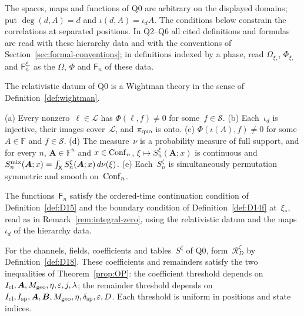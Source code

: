 The spaces, maps and functions of Q0 are arbitrary on the displayed domains; put $\deg(d,A)=d$ and $\iota(d,A)=\iota_dA$. The conditions below constrain the correlations at separated positions. In Q2--Q6 all cited definitions and formulas are read with these hierarchy data and with the conventions of Section~\ref{sec:formal-conventions}; in definitions indexed by a phase, read $\Omega_{\xi_*}$, $\Phi_{\xi_*}$ and $\mathsf F_n^{\xi_*}$ as the $\Omega$, $\Phi$ and $\mathsf F_n$ of these data.

\begin{definition}\label{def:Q2}
The relativistic datum of Q0 is a Wightman theory in the sense of Definition~\ref{def:wightman}.
\end{definition}

\begin{definition}\label{def:Q3}
\textup{(a)} Every nonzero~$\ell\in\mathcal L$ has $\Phi(\ell,f)\ne0$ for some~$f\in\mathcal S$.
\textup{(b)} Each~$\iota_d$ is injective, their images cover~$\mathcal L$, and $\pi_{\rm quo}$ is onto.
\textup{(c)} $\Phi(\iota(A),f)\ne0$ for some~$A\in\mathbb F$ and $f\in\mathcal S$.
\textup{(d)} The measure~$\nu$ is a probability measure of full support, and for every $n$, $\boldsymbol A\in\mathbb F^n$ and $x\in\mathrm{Conf}_{n}$, $\xi\mapsto S_n^\xi(\boldsymbol A;x)$ is continuous and $S_n^{\rm mix}(\boldsymbol A;x)=\int_{\mathsf{X}}S_n^\xi(\boldsymbol A;x)\,d\nu(\xi)$.
\textup{(e)} Each~$S_n^\zeta$ is simultaneously permutation symmetric and smooth on~$\mathrm{Conf}_{n}$.
\end{definition}

\begin{definition}\label{def:Q4}
The functions~$\mathsf F_n$ satisfy the ordered-time continuation condition of Definition~\ref{def:D15} and the boundary condition of Definition~\ref{def:D14f} at~$\xi_*$, read as in Remark~\ref{rem:integral-zero}, using the relativistic datum and the maps~$\iota_d$ of the hierarchy data.
\end{definition}

\begin{definition}[Q5. Products]\label{def:Q5}
For the channels, fields, coefficients and tables~$S^\zeta$ of Q0, form~$\mathcal R_D^\zeta$ by Definition~\ref{def:D18}. These coefficients and remainders satisfy the two inequalities of Theorem~\ref{prop:OP}: the coefficient threshold depends on $I_{\rm cl},\boldsymbol A,M_{\rm geo},\eta,\varepsilon,j,\lambda$; the remainder threshold depends on $I_{\rm cl},I_{\rm sp},\boldsymbol A,\boldsymbol B,M_{\rm geo},\eta,\delta_{\rm sp},\varepsilon,D$. Each threshold is uniform in positions and state indices.
\end{definition}

